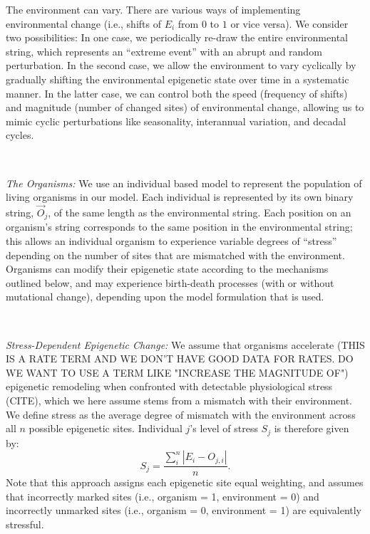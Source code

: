 \documentclass{article}
\begin{document}
The environment can vary. There are various ways of implementing environmental change (i.e., shifts of $E_i$ from $0$ to $1$ or vice versa). We consider two possibilities: In one case, we periodically re-draw the entire environmental string, which represents an ``extreme event'' with an abrupt and random perturbation. In the second case, we allow the environment to vary cyclically by gradually shifting the environmental epigenetic state over time in a systematic manner. In the latter case, we can control both the speed (frequency of shifts) and magnitude (number of changed sites) of environmental change, allowing us to mimic cyclic perturbations like seasonality, interannual variation, and decadal cycles.

\ 


\noindent \textit{The Organisms:} We use an individual based model to represent the population of living organisms in our model. Each individual is represented by its own binary string, $\vec{O}_j$, of the same length as the environmental string. Each position on an organism's string corresponds to the same position in the environmental string; this allows an individual organism to experience variable degrees of ``stress'' depending on the number of sites that are mismatched with the environment. Organisms can modify their epigenetic state according to the mechanisms outlined below, and may experience birth-death processes (with or without mutational change), depending upon the model formulation that is used. %

\ 

\noindent \textit{Stress-Dependent Epigenetic Change:} We assume that organisms accelerate (THIS IS A RATE TERM AND WE DON'T HAVE GOOD DATA FOR RATES. DO WE WANT TO USE A TERM LIKE "INCREASE THE MAGNITUDE OF") epigenetic remodeling when confronted with detectable physiological stress (CITE), which we here assume stems from a mismatch with their environment. We define stress as the average degree of mismatch with the environment across all $n$ possible epigenetic sites. Individual $j$'s level of stress $S_j$ is therefore given by:
\begin{equation}
   S_j = \frac{\sum_i ^n | E_i - O_{j,i} |}{n} .
\end{equation}
Note that this approach assigns each epigenetic site equal weighting, and assumes that incorrectly marked sites (i.e., organism = 1, environment = 0) and incorrectly unmarked sites (i.e., organism = 0, environment = 1) are equivalently stressful.
\end{document}
